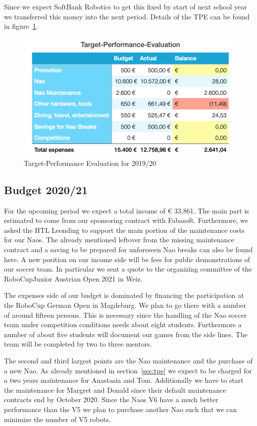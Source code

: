 \documentclass[11pt]{article}
\begin{document}
Since we expect SoftBank Robotics to get this fixed by start of next school year we transferred this money into the next period. Details of the TPE can be found in figure~\ref{fig:tpe}.
\begin{figure}
\begin{center}
\includegraphics[scale=0.5]{img/targetPerformanceEvaluation.png}
\end{center}
\caption{Target-Performance Evaluation for 2019/20}
\label{fig:tpe}
\end{figure}

\subsection{Budget 2020/21}\label{sec:budget}
For the upcoming period we expect a total income of € 33,861. The main part is estimated to come from our sponsoring contract with Fabasoft. Furthermore, we asked the HTL Leonding to support the main portion of the maintenance costs for our Naos. The already mentioned leftover from the missing maintenance contract and a saving to be prepared for unforeseen Nao breaks can also be found here. A new position on our income side will be fees for public demonstrations of our soccer team. In particular we sent a quote to the organizing committee of the RoboCupJunior Austrian Open 2021 in Weiz.

The expenses side of our budget is dominated by financing the participation at the RoboCup German Open in Magdeburg. We plan to go there with a number of around fifteen persons. This is necessary since the handling of the Nao soccer team under competition conditions needs about eight students. Furthermore a number of about five students will document our games from the side lines. The team will be completed by two to three mentors.

The second and third largest points are the Nao maintenance and the purchase of a new Nao. As already mentioned in section~\ref{sec:tpe} we expect to be charged for a two years maintenance for Anastasia and Tom. Additionally we have to start the maintenance for Margret and Donald since their default maintenance contracts end by October 2020. Since the Naos V6 have a much better performance than the V5 we plan to purchase another Nao such that we can minimize the number of V5 robots. 
\end{document}
